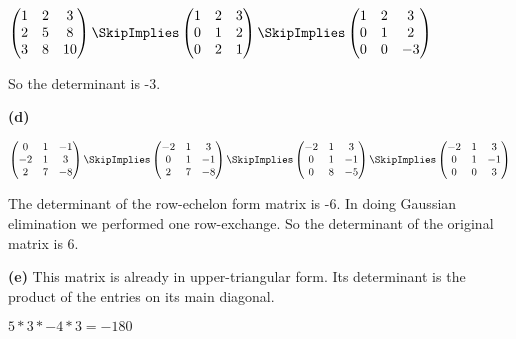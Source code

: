 \documentclass[oneside,12pt]{amsart}
\begin{document}
\bigskip

$
\begin{pmatrix}
1 & 2 & 3 \\
2 & 5 & 8 \\
3 & 8 & 10
\end{pmatrix}
\SkipImplies
\begin{pmatrix}
1 & 2 & 3 \\
0 & 1 & 2 \\
0 & 2 & 1
\end{pmatrix}
\SkipImplies
\begin{pmatrix}
1 & 2 & 3 \\
0 & 1 & 2 \\
0 & 0 & -3
\end{pmatrix}
$

\bigskip

So the determinant is -3.

\bigskip

\textbf{(d)}

\bigskip

$
\begin{pmatrix}
0 & 1 & -1 \\
-2 & 1 & 3 \\
2 & 7 & -8
\end{pmatrix}
\SkipImplies
\begin{pmatrix}
-2 & 1 & 3 \\
0 & 1 & -1 \\
2 & 7 & -8
\end{pmatrix}
\SkipImplies
\begin{pmatrix}
-2 & 1 & 3 \\
0 & 1 & -1 \\
0 & 8 & -5
\end{pmatrix}
\SkipImplies
\begin{pmatrix}
-2 & 1 & 3 \\
0 & 1 & -1 \\
0 & 0 & 3
\end{pmatrix}
$

\bigskip

The determinant of the row-echelon form matrix is -6. In doing Gaussian elimination
we performed one row-exchange. So the determinant of the original matrix is 6.

\bigskip

\textbf{(e)} This matrix is already in upper-triangular form. Its determinant
is the product of the entries on its main diagonal.

$5*3*-4*3 = -180$
\end{document}
